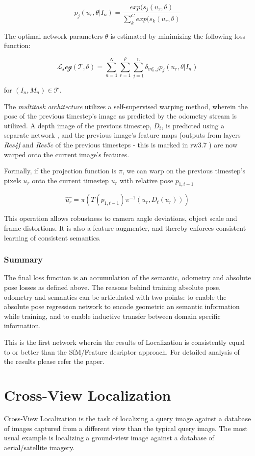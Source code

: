 \[p_j(u_r, \theta | I_n) = \frac{exp(s_j(u_r, \theta)}{\sum_{k}^{C}exp(s_k(u_r, \theta)}\]

The optimal network parameters $\theta$ is estimated by minimizing the following loss function:

\[\mathcal{L_seg}(\mathcal{T}, \theta) = \sum_{n=1}^{N}\sum_{r=1}^{\rho}\sum_{j=1}^{C} \delta_{m_n^r, j}p_j(u_r, \theta | I_n)\]

for $(I_n, M_n) \in \mathcal{T}$.

The \emph{multitask architecture} utilizes a self-supervised warping method, wherein the pose of the previous timestep's image as predicted by the odometry stream is utilized.
A depth image of the previous timestep, $D_t$, is predicted using a separate network \cite{Mayer2016}, and the previous image's feature maps (outputs from layers \emph{Res4f} and \emph{Res5c} of the previous timesteps - this is marked in \figurename{rw3.7} ) are now warped onto the current
image's features. 

Formally, if the projection function is $\pi$, we can warp on the previous timestep's pixels $u_r$ onto the current timestep $\hat{u_r}$ with relative pose $p_{1,t-1}$

\[\hat{u_r} = \pi(T(p_{1,t-1}) \pi^{-1}(u_r, D_t(u_r)))\]


This operation allows robustness to camera angle deviations, object scale and frame distortions. It is also a feature augmenter, and thereby enforces consistent
learning of consistent semantics.

\subsubsection{Summary}
The final loss function is an accumulation of the semantic, odometry and absolute pose losses as defined above. The reasons behind training absolute pose, odometry and semantics 
can be articulated with two points: to enable the absolute pose regression network to encode geometric an semantic information while training, and to enable inductive
transfer between domain specific information. 

This is the first network wherein the results of Localization is consistently equal to or better than the SfM/Feature desriptor approach. For detailed analysis of the results
please refer the paper. 

\section{Cross-View Localization}
Cross-View Localization is the task of localizing a query image against a database of images captured from a different view than the typical query image. The most usual example is localizing a ground-view image against a database of aerial/satellite imagery.

